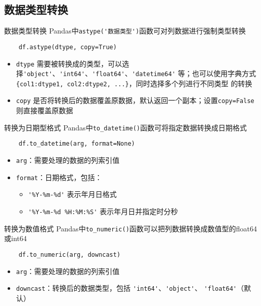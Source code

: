 \documentclass[t]{beamer}
\begin{document}
\subsection{数据类型转换}
\begin{frame}[fragile]{数据类型转换}
    Pandas中\verb|astype('数据类型')|函数可对列数据进行强制类型转换
\begin{lstlisting}
    df.astype(dtype, copy=True)
\end{lstlisting}
\begin{itemize}
    \item \verb|dtype| 需要被转换成的类型，可以选择\verb|'object'|、\verb|'int64'|、\verb|'float64'|、\verb|'datetime64'|
等；也可以使用字典方式\verb|{col1:dtype1, col2:dtype2, ...}|，同时选择多个列进行不同类型
的转换
\item \verb|copy| 是否将转换后的数据覆盖原数据，默认返回一个副本；设置\verb|copy=False|则直接覆盖原数据
\end{itemize}
\end{frame}

\begin{frame}[fragile]{转换为日期型格式}
    Pandas中\verb|to_datetime()|函数可将指定数据转换成日期格式
\begin{lstlisting}
    df.to_datetime(arg, format=None)
\end{lstlisting}

\begin{itemize}
    \item \verb|arg|：需要处理的数据的列索引值
    \item \verb|format|：日期格式，包括：
\begin{itemize}\normalsize
    \item \verb|'%Y-%m-%d'| 表示年月日格式
    \item  \verb|'%Y-%m-%d %H:%M:%S'| 表示年月日并指定时分秒
\end{itemize}
\end{itemize}
\end{frame}


\begin{frame}[fragile]{转换为数值格式}
    Pandas中\verb|to_numeric()|函数可以把列数据转换成数值型的float64或int64
\begin{lstlisting}
    df.to_numeric(arg, downcast)
\end{lstlisting}

\begin{itemize}
    \item \verb|arg|：需要处理的数据的列索引值
    \item \verb|downcast|：转换后的数据类型，包括 \verb|'int64'|、\verb|'object'|、 \verb|'float64'|（默认）
\end{itemize}
\end{frame}
\end{document}
